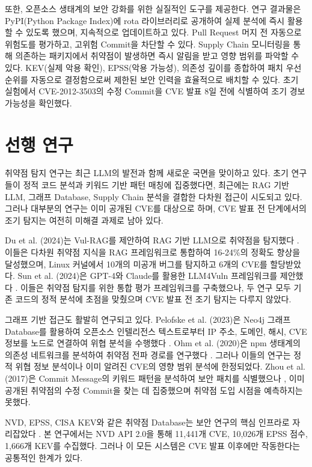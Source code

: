 ﻿\documentclass[conference]{IEEEtran}
\begin{document}
또한, 오픈소스 생태계의 보안 강화를 위한 실질적인 도구를 제공한다. 연구 결과물은 PyPI(Python Package Index)에 rota 라이브러리로 공개하여 실제 분석에 즉시 활용할 수 있도록 했으며, 지속적으로 업데이트하고 있다. Pull Request 머지 전 자동으로 위험도를 평가하고, 고위험 Commit을 차단할 수 있다. Supply Chain 모니터링을 통해 의존하는 패키지에서 취약점이 발생하면 즉시 알림을 받고 영향 범위를 파악할 수 있다. KEV(실제 악용 확인), EPSS(악용 가능성), 의존성 깊이를 종합하여 패치 우선순위를 자동으로 결정함으로써 제한된 보안 인력을 효율적으로 배치할 수 있다. 초기 실험에서 CVE-2012-3503의 수정 Commit을 CVE 발표 8일 전에 식별하여 조기 경보 가능성을 확인했다.


\section{선행 연구}

취약점 탐지 연구는 최근 LLM의 발전과 함께 새로운 국면을 맞이하고 있다. 초기 연구들이 정적 코드 분석과 키워드 기반 패턴 매칭에 집중했다면, 최근에는 RAG 기반 LLM, 그래프 Database, Supply Chain 분석을 결합한 다차원 접근이 시도되고 있다. 그러나 대부분의 연구는 이미 공개된 CVE를 대상으로 하며, CVE 발표 전 단계에서의 조기 탐지는 여전히 미해결 과제로 남아 있다.

Du et al. (2024)는 Vul-RAG를 제안하여 RAG 기반 LLM으로 취약점을 탐지했다 \cite{vulrag2024}. 이들은 다차원 취약점 지식을 RAG 프레임워크로 통합하여 16-24\%의 정확도 향상을 달성했으며, Linux 커널에서 10개의 미공개 버그를 탐지하고 6개의 CVE를 할당받았다. Sun et al. (2024)은 GPT-4와 Claude를 활용한 LLM4Vuln 프레임워크를 제안했다 \cite{sun2024}. 이들은 취약점 탐지를 위한 통합 평가 프레임워크를 구축했으나, 두 연구 모두 기존 코드의 정적 분석에 초점을 맞췄으며 CVE 발표 전 조기 탐지는 다루지 않았다.

그래프 기반 접근도 활발히 연구되고 있다. Pelofske et al. (2023)은 Neo4j 그래프 Database를 활용하여 오픈소스 인텔리전스 텍스트로부터 IP 주소, 도메인, 해시, CVE 정보를 노드로 연결하여 위협 분석을 수행했다 \cite{pelofske2023}. Ohm et al. (2020)은 npm 생태계의 의존성 네트워크를 분석하여 취약점 전파 경로를 연구했다 \cite{ohm2020}. 그러나 이들의 연구는 정적 위협 정보 분석이나 이미 알려진 CVE의 영향 범위 분석에 한정되었다. Zhou et al. (2017)은 Commit Message의 키워드 패턴을 분석하여 보안 패치를 식별했으나 \cite{zhou2017}, 이미 공개된 취약점의 수정 Commit을 찾는 데 집중했으며 취약점 도입 시점을 예측하지는 못했다.

NVD, EPSS, CISA KEV와 같은 취약점 Database는 보안 연구의 핵심 인프라로 자리잡았다 \cite{nvd2025, epss2025, cisa2025}. 본 연구에서는 NVD API 2.0을 통해 11,441개 CVE, 10,026개 EPSS 점수, 1,666개 KEV를 수집했다. 그러나 이 모든 시스템은 CVE 발표 이후에만 작동한다는 공통적인 한계가 있다.
\end{document}
